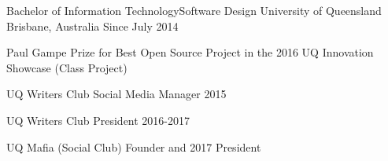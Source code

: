


\begin{cventries}


\cventry
{Bachelor of Information Technology{\enskip\cdotp\enskip}Software Design} %
{University of Queensland} %
{Brisbane, Australia} %
{Since July 2014} %
{ %
\begin{cvitems}
\item {Paul Gampe Prize for Best Open Source Project in the 2016 UQ Innovation Showcase (Class Project)}
\item {UQ Writers Club Social Media Manager 2015}
\item {UQ Writers Club President 2016-2017}
\item {UQ Mafia (Social Club) Founder and 2017 President}
\end{cvitems}
}


\end{cventries}